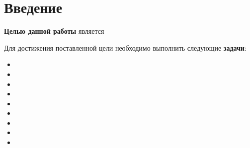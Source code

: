 \chapter*{Введение}

\textbf{Целью данной работы} является

Для достижения поставленной цели необходимо выполнить следующие
\textbf{задачи}:
\begin{itemize}[left=\parindent]
    \item
    \item
    \item
    \item
    \item
    \item
    \item
    \item
    \item
\end{itemize}
